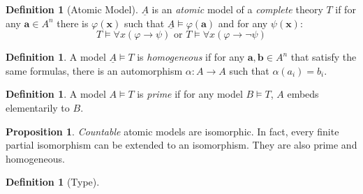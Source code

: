 \documentclass[a4paper,10pt]{article}
\theoremstyle{definition}
\newtheorem{definition}[theorem]{Definition}
\newtheorem{proposition}[theorem]{Proposition}
\let\vec\mathbf
\let\phi\varphi
\begin{document}
\begin{definition}[Atomic Model]
    $\underline{A}$ is an \emph{atomic} model of a \emph{complete} theory $T$ if for any $\vec{a} \in A^n$ there is $\phi(\vec{x})$ such that $\underline{A} \models \phi(\vec{a})$ and for any $\psi(\vec{x})$:
    \[
        T \vDash \forall x (\phi \rightarrow \psi) \text{ or } T \vDash \forall x (\phi \rightarrow \neg \psi)
    \]
\end{definition}

\begin{definition}
    A model $\underline{A} \models T$ is \emph{homogeneous} if for any $\vec{a}, \vec{b} \in A^n$ that satisfy the same formulas, there is an automorphism $\alpha \colon A \longrightarrow A$ such that $\alpha(a_i) = b_i$.
\end{definition}

\begin{definition}
    A model $A \models T$ is \emph{prime} if for any model $B \models T$, $A$ embeds elementarily to $B$.
\end{definition}

\begin{proposition} 
    \emph{Countable} atomic models are isomorphic. In fact, every finite partial isomorphism can be extended to an isomorphism. They are also prime and homogeneous.
\end{proposition}

\begin{definition}[Type]
    
    
\end{definition}
\end{document}

